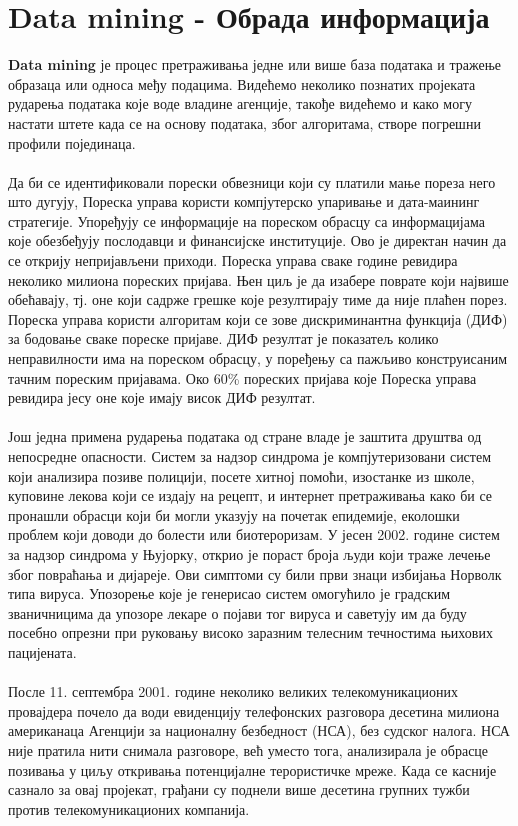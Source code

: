 \documentclass{article}
\begin{document}
\section{Data mining - Обрада информација}
\textbf{Data mining} је процес претраживања једне или више база података и тражење образаца или односа међу подацима. Видећемо неколико познатих пројеката рударења података које воде владине агенције, такође видећемо и како могу настати штете када се на основу података, због алгоритама, створе погрешни профили појединаца.
\\\\
Да би се идентификовали порески обвезници који су платили мање пореза него што дугују, Пореска управа користи компјутерско упаривање и дата-маининг стратегије. Упоређују се информације на пореском обрасцу са информацијама које обезбеђују послодавци и финансијске институције. Ово је директан начин да се открију непријављени приходи. Пореска управа сваке године ревидира неколико милиона пореских пријава. Њен циљ је да изабере поврате који највише обећавају, тј. оне који садрже грешке које резултирају тиме да није плаћен порез. Пореска управа користи алгоритам који се зове дискриминантна функција (ДИФ) за бодовање сваке пореске пријаве. ДИФ резултат је показатељ колико неправилности има на пореском обрасцу, у поређењу са пажљиво конструисаним тачним пореским пријавама. Око 60\% пореских пријава које Пореска управа ревидира јесу оне које имају висок ДИФ резултат.
\\\\
Још једна примена рударења података од стране владе је заштита друштва од непосредне опасности. Систем за надзор синдрома је компјутеризовани систем који анализира позиве полицији, посете хитној помоћи, изостанке из школе, куповине лекова који се издају на рецепт, и интернет претраживања како би се пронашли обрасци који би могли указују на почетак епидемије, еколошки проблем који доводи до болести или биотероризам. У јесен 2002. године систем за надзор синдрома у Њујорку, открио је пораст броја људи који траже лечење због повраћања и дијареје. Ови симптоми су били први знаци избијања Норволк типа вируса. Упозорење које је генерисао систем омогућило је градским званичницима да упозоре лекаре о појави тог вируса и саветују им да буду посебно опрезни при руковању високо заразним телесним течностима њихових пацијената.
\\\\
После 11. септембра 2001. године неколико великих телекомуникационих провајдера почело да води евиденцију телефонских разговора десетина милиона американаца Агенцији за националну безбедност (НСА), без судског налога. НСА није пратила нити снимала разговоре, већ уместо тога, анализирала је обрасце позивања у циљу откривања потенцијалне терористичке мреже. Када се касније сазнало за овај пројекат, грађани су поднели више десетина групних тужби против телекомуникационих компанија.
\end{document}

